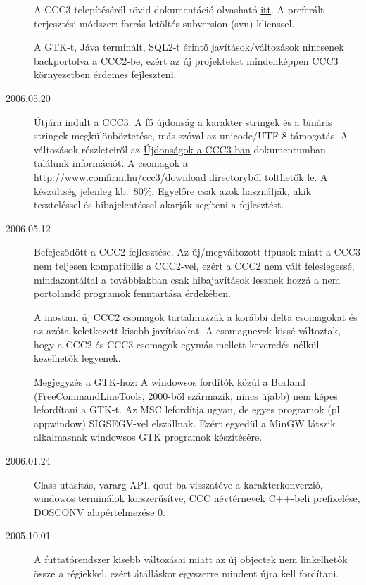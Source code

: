 \begin{description}
  A CCC3 telepítéséről rövid dokumentáció olvasható 
  \href{http://ccc.comfirm.hu./ccc3/download/olvass.html}{itt}.
  A preferált terjesztési módszer: forrás letöltés subversion 
  (svn) klienssel.
  
  A GTK-t, Jáva terminált, SQL2-t érintő javítások/változások
  nincsenek backportolva a CCC2-be, ezért az új projekteket 
  mindenképpen CCC3 környezetben érdemes fejleszteni.

\label{20060520}
\item[2006.05.20]
  Útjára indult a CCC3.
  A fő újdonság a karakter stringek 
  és a bináris stringek megkülönböztetése,
  más szóval az unicode/UTF-8 támogatás.
  A változások részleteiről az
  \href{ccc3_ujdonsagok.html}{Újdonságok a CCC3-ban}
  dokumentumban találunk információt.
  A csomagok a 
  \href{http://www.comfirm.hu/ccc3/download}{http://www.comfirm.hu/ccc3/download}
  directoryból tölthetők le. A készültség jelenleg kb.~80\%.
  Egyelőre csak azok használják, akik teszteléssel és hibajelentéssel
  akarják segíteni a fejlesztést.


\label{20060512}
\item[2006.05.12]

  Befejeződött a CCC2 fejlesztése.
  Az új/megváltozott típusok miatt a CCC3 nem teljesen 
  kompatibilis a CCC2-vel, ezért a CCC2 nem vált feleslegessé,
  mindazontáltal a továbbiakban csak hibajavítások lesznek hozzá
  a nem portolandó programok fenntartása érdekében.

  A mostani új CCC2 csomagok tartalmazzák a korábbi delta csomagokat
  és az azóta keletkezett kisebb javításokat. A csomagnevek
  kissé változtak, hogy a CCC2 és CCC3  csomagok egymás mellett
  keveredés nélkül kezelhetők legyenek.

  Megjegyzés a GTK-hoz: A windowsos fordítók közül a Borland
  (FreeCommandLineTools, 2000-ből származik, nincs újabb) nem képes 
  lefordítani a GTK-t. Az MSC lefordítja ugyan, de egyes programok 
  (pl. appwindow) SIGSEGV-vel elszállnak. Ezért egyedül a MinGW 
  látszik alkalmasnak windowsos GTK programok készítésére.

\label{20060124}
\item[2006.01.24]
  Class utasítás, 
  vararg API, 
  qout-ba visszatéve a karakterkonverzió,
  windowos terminálok korszerűsítve, 
  CCC névtérnevek C++-beli prefixelése,
  DOSCONV alapértelmezése 0.

\label{20051001}
\item[2005.10.01]
  A futtatórendszer kisebb változásai miatt 
  az új objectek nem linkelhetők össze a régiekkel, 
  ezért átálláskor egyszerre mindent újra kell fordítani.


\end{description}
